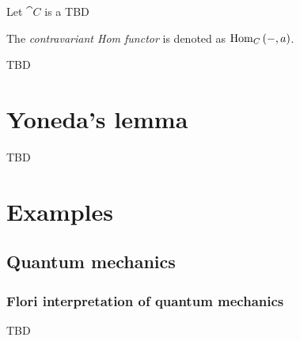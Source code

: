 \begin{definition}
\label{def:con_hom_functor}
Let $\cat{C}$ is a 
TBD

The \textit{contravariant Hom functor} is denoted as $\mathrm{Hom}_{C}\left(-, a\right)$.
\end{definition}


TBD

\section{Yoneda's lemma}

TBD

\section{Examples}

\subsection{Quantum mechanics}

\subsubsection{Flori interpretation of quantum mechanics}
TBD
